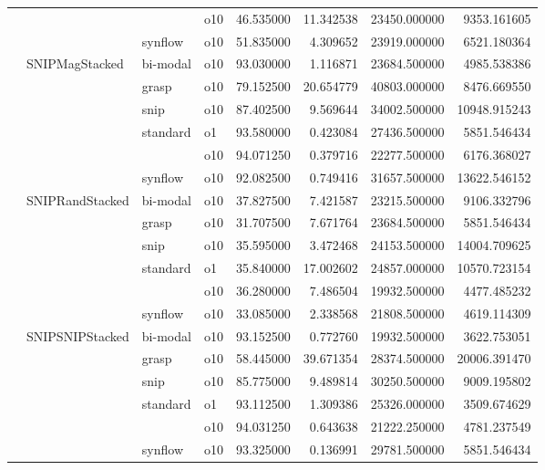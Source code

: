 \begin{longtable}{llllrrrr}
      &     &         & o10 &  46.535000 &  11.342538 &     23450.000000 &   9353.161605 \\
      &     & synflow & o10 &  51.835000 &   4.309652 &     23919.000000 &   6521.180364 \\
      & SNIPMagStacked & bi-modal & o10 &  93.030000 &   1.116871 &     23684.500000 &   4985.538386 \\
      &     & grasp & o10 &  79.152500 &  20.654779 &     40803.000000 &   8476.669550 \\
      &     & snip & o10 &  87.402500 &   9.569644 &     34002.500000 &  10948.915243 \\
      &     & standard & o1 &  93.580000 &   0.423084 &     27436.500000 &   5851.546434 \\
      &     &         & o10 &  94.071250 &   0.379716 &     22277.500000 &   6176.368027 \\
      &     & synflow & o10 &  92.082500 &   0.749416 &     31657.500000 &  13622.546152 \\
      & SNIPRandStacked & bi-modal & o10 &  37.827500 &   7.421587 &     23215.500000 &   9106.332796 \\
      &     & grasp & o10 &  31.707500 &   7.671764 &     23684.500000 &   5851.546434 \\
      &     & snip & o10 &  35.595000 &   3.472468 &     24153.500000 &  14004.709625 \\
      &     & standard & o1 &  35.840000 &  17.002602 &     24857.000000 &  10570.723154 \\
      &     &         & o10 &  36.280000 &   7.486504 &     19932.500000 &   4477.485232 \\
      &     & synflow & o10 &  33.085000 &   2.338568 &     21808.500000 &   4619.114309 \\
      & SNIPSNIPStacked & bi-modal & o10 &  93.152500 &   0.772760 &     19932.500000 &   3622.753051 \\
      &     & grasp & o10 &  58.445000 &  39.671354 &     28374.500000 &  20006.391470 \\
      &     & snip & o10 &  85.775000 &   9.489814 &     30250.500000 &   9009.195802 \\
      &     & standard & o1 &  93.112500 &   1.309386 &     25326.000000 &   3509.674629 \\
      &     &         & o10 &  94.031250 &   0.643638 &     21222.250000 &   4781.237549 \\
      &     & synflow & o10 &  93.325000 &   0.136991 &     29781.500000 &   5851.546434 \\

\end{longtable}

